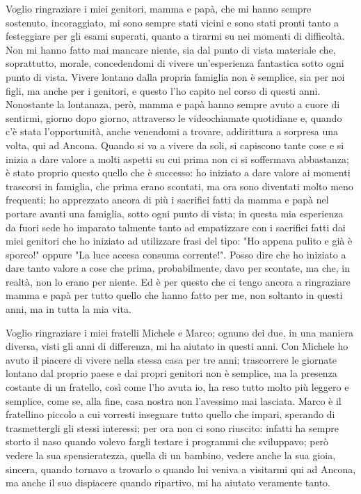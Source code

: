 {Voglio ringraziare i miei genitori, mamma e papà, che mi hanno sempre sostenuto, incoraggiato, mi sono sempre stati vicini e sono stati pronti tanto a festeggiare per gli esami superati, quanto a tirarmi su nei momenti di difficoltà. Non mi hanno fatto mai mancare niente, sia dal punto di vista materiale che, soprattutto, morale, concedendomi di vivere un’esperienza fantastica sotto ogni punto di vista. Vivere lontano dalla propria famiglia non è semplice, sia per noi figli, ma anche per i genitori, e questo l'ho capito nel corso di questi anni. Nonostante la lontanaza, però, mamma e papà hanno sempre avuto a cuore di sentirmi, giorno dopo giorno, attraverso le videochiamate quotidiane e, quando c'è stata l'opportunità, anche venendomi a trovare, addirittura a sorpresa una volta, qui ad Ancona. Quando si va a vivere da soli, si capiscono tante cose e si inizia a dare valore a molti aspetti su cui prima non ci si soffermava abbastanza; è stato proprio questo quello che è successo: ho iniziato a dare valore ai momenti trascorsi in famiglia, che prima erano scontati, ma ora sono diventati molto meno frequenti; ho apprezzato ancora di più i sacrifici fatti da mamma e papà nel portare avanti una famiglia, sotto ogni punto di vista; in questa mia esperienza da fuori sede ho imparato talmente tanto ad empatizzare con i sacrifici fatti dai miei genitori che ho iniziato ad utilizzare frasi del tipo: "Ho appena pulito e già è sporco!" oppure "La luce accesa consuma corrente!". Posso dire che ho iniziato a dare tanto valore a cose che prima, probabilmente, davo per scontate, ma che, in realtà, non lo erano per niente. Ed è per questo che ci tengo ancora a ringraziare mamma e papà per tutto quello che hanno fatto per me, non soltanto in questi anni, ma in tutta la mia vita.

Voglio ringraziare i miei fratelli Michele e Marco; ognuno dei due, in una maniera diversa, visti gli anni di differenza, mi ha aiutato in questi anni. Con Michele ho avuto il piacere di vivere nella stessa casa per tre anni; trascorrere le giornate lontano dal proprio paese e dai propri genitori non è semplice, ma la presenza costante di un fratello, così come l’ho avuta io, ha reso tutto molto più leggero e semplice, come se, alla fine, casa nostra non l’avessimo mai lasciata. Marco è il fratellino piccolo a cui vorresti insegnare tutto quello che impari, sperando di trasmettergli gli stessi interessi; per ora non ci sono riuscito: infatti ha sempre storto il naso quando volevo fargli testare i programmi che sviluppavo; però vedere la sua spensieratezza, quella di un bambino, vedere anche la sua gioia, sincera, quando tornavo a trovarlo o quando lui veniva a visitarmi qui ad Ancona, ma anche il suo dispiacere quando ripartivo, mi ha aiutato veramente tanto.

}
